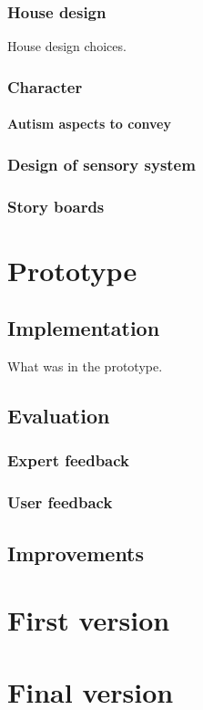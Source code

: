 \documentclass[11pt]{report}
\begin{document}
\subsection{House design}
House design choices. 
\subsection{Character}
\subsubsection{Autism aspects to convey}
\subsection{Design of sensory system}
\subsection{Story boards}

\chapter{Prototype}

\section{Implementation}
What was in the prototype.
\section{Evaluation}
\subsection{Expert feedback}
\subsection{User feedback}
\section{Improvements}

\chapter{First version}

\chapter{Final version}
\end{document}
